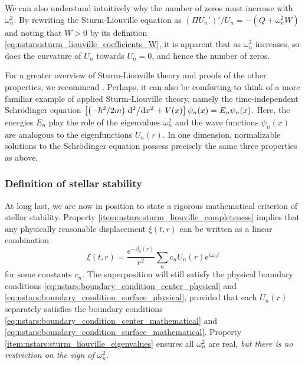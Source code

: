 We can also understand intuitively why the number of zeros must increase with $\omega_n^2$.
By rewriting the Sturm-Liouville equation as $\left( \Pi U_n' \right)' / U_n = - \left( Q + \omega_n^2 W \right)$ and noting that $W > 0$ by its definition \eqref{eq:nstars:sturm_liouville_coefficients_W}, it is apparent that as $\omega_n^2$ increases, so does the curvature of $U_n$ towards $U_n = 0$, and hence the number of zeros.

For a greater overview of Sturm-Liouville theory and proofs of the other properties, we recommend \cite{ref:morse_feshbach}.
Perhaps, it can also be comforting to think of a more familiar example of applied Sturm-Liouville theory, namely the time-independent Schrödinger equation $\left[ \left(-\hbar^2/2m\right)\odv[2]{}/{x} + V(x) \right] \psi_n(x) = E_n \psi_n(x)$.
Here, the energies $E_n$ play the role of the eigenvalues $\omega_n^2$ and the wave functions $\psi_n(x)$ are analogous to the eigenfunctions $U_n(r)$.
In one dimension, normalizable solutions to the Schrödinger equation possess precisely the same three properties as above.

\iffalse
We can give a quick proof of the first part.
Property \eqref{eq:nstars:inner_product_hermitean} implies that $-\omega_n^2 \braket{W U_n  | U_m} = -\omega_m^2 \braket{W U_m | U_n}$, so $\left( \omega_m^2 - \omega_n^2 \right) \braket{W U_m | U_n} = 0$.
If $U_m = U_n$ are equal, then $\braket{W U_m | U_n} \neq 0$, so $\omega_m^2 = \omega_n^2$ must be equal.
On the other hand, if $\omega_m^2 \neq \omega_n^2$, then $\braket{W U_m | U_n} = 0$, and $U_m \neq U_n$ must be different.
\fi

\subsubsection{Definition of stellar stability}

At long last, we are now in position to state a rigorous mathematical criterion of stellar stability.
Property \ref{item:nstars:sturm_liouville_completeness} implies that any physically reasonable displacement $\xi(t,r)$ can be written as a linear combination
\begin{equation}
	\xi(t,r) = \frac{e^{-\beta_0(r)}}{r^2} \sum_n c_n U_n(r) e^{i \omega_n t}
\label{eq:nstars:displacement_general_solution}
\end{equation}
for some constants $c_n$.
The superposition will still satisfy the physical boundary conditions \eqref{eq:nstars:boundary_condition_center_physical} and \eqref{eq:nstars:boundary_condition_surface_physical}, provided that each $U_n(r)$ separately satisfies the boundary conditions \eqref{eq:nstars:boundary_condition_center_mathematical} and \eqref{eq:nstars:boundary_condition_surface_mathematical}.
Property \ref{item:nstars:sturm_liouville_eigenvalues} ensures all $\omega_n^2$ are real, \emph{but there is no restriction on the sign of $\omega_n^2$}.

